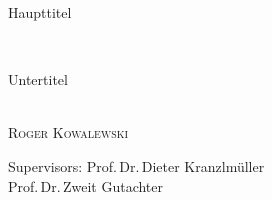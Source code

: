 \begin{titlepage}
  \phantom{}
  \vfill
  \begin{center}
    \begin{singlespace*}
    \begin{Huge}
     Haupttitel
    \end{Huge}\\[0.2cm]
    \begin{Large}
      Untertitel
    \end{Large}\\[1em]
      \vskip 0.25cm
      \textsc{Roger Kowalewski}\par
    \end{singlespace*}
  \end{center}
  \vfill
  \begin{singlespace*}
    Supervisors:            Prof.\,Dr.\,Dieter Kranzlmüller\\
    \phantom{Supervisors:}  Prof.\,Dr.\,Zweit Gutachter
  \end{singlespace*}
\end{titlepage}

\newpage
\null
\thispagestyle{empty}
\newpage
